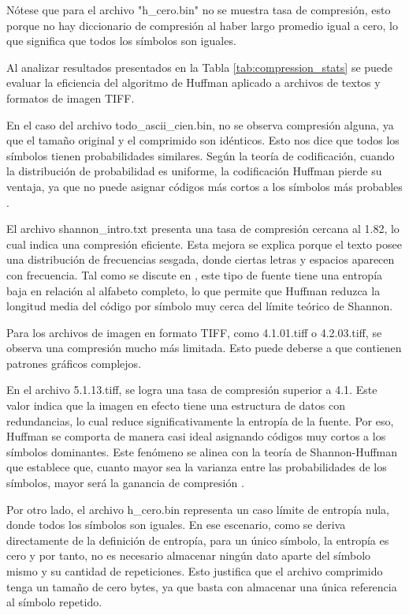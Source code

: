 \documentclass[conference,onecolumn,12pt]{IEEEtran}
\numberwithin{equation}{subsection}
\begin{document}
Nótese que para el archivo "h\_cero.bin" no se muestra tasa de compresión, esto porque no hay diccionario de compresión al haber largo promedio igual a cero, lo que significa que todos los símbolos son iguales.

Al analizar resultados presentados en la Tabla \ref{tab:compression_stats} se puede evaluar la eficiencia del algoritmo de Huffman aplicado a archivos de textos y formatos de imagen TIFF.

En el caso del archivo todo\_ascii\_cien.bin, no se observa compresión alguna, ya que el tamaño original y el comprimido son idénticos. Esto nos dice que todos los símbolos tienen probabilidades similares. Según la teoría de codificación, cuando la distribución de probabilidad es uniforme, la codificación Huffman pierde su ventaja, ya que no puede asignar códigos más cortos a los símbolos más probables \cite{haykin}.

El archivo shannon\_intro.txt presenta una tasa de compresión cercana al 1.82, lo cual indica una compresión eficiente. Esta mejora se explica porque el texto posee una distribución de frecuencias sesgada, donde ciertas letras y espacios aparecen con  frecuencia. Tal como se discute en \cite{haykin}, este tipo de fuente tiene una entropía baja en relación al alfabeto completo, lo que permite que Huffman reduzca la longitud media del código por símbolo muy cerca del límite teórico de Shannon.

Para los archivos de imagen en formato TIFF, como 4.1.01.tiff o 4.2.03.tiff, se observa una compresión mucho más limitada. Esto puede deberse a que contienen patrones gráficos complejos.

En el archivo 5.1.13.tiff, se logra una tasa de compresión superior a 4.1. Este valor indica que la imagen en efecto tiene una estructura de datos con redundancias, lo cual reduce significativamente la entropía de la fuente. Por eso, Huffman se comporta de manera casi ideal asignando códigos muy cortos a los símbolos dominantes. Este fenómeno se alinea con la teoría de Shannon-Huffman que establece que, cuanto mayor sea la varianza entre las probabilidades de los símbolos, mayor será la ganancia de compresión \cite{haykin}.

Por otro lado, el archivo h\_cero.bin representa un caso límite de entropía nula, donde todos los símbolos son iguales. En ese escenario, como se deriva directamente de la definición de entropía, para un único símbolo, la entropía es cero y por tanto, no es necesario almacenar ningún dato aparte del símbolo mismo y su cantidad de repeticiones. Esto justifica que el archivo comprimido tenga un tamaño de cero bytes, ya que basta con almacenar una única referencia al símbolo repetido. 
\end{document}
